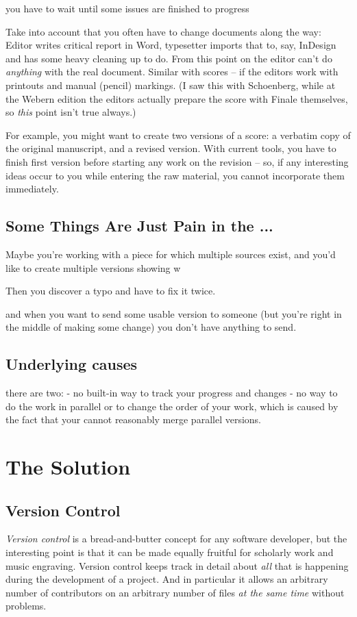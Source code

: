 \documentclass[11pt,a4paper]{article}
\begin{document}
you have to wait until some issues are finished to progress

Take into account that you often have to change documents along the way:
Editor writes critical report in Word, typesetter imports that to, say, InDesign
and has some heavy cleaning up to do. From this point on the editor can't do
\emph{anything} with the real document. Similar with scores -- if the editors work
with printouts and manual (pencil) markings. (I saw this with Schoenberg, while at
the Webern edition the editors actually prepare the score with Finale themselves,
so \emph{this} point isn't true always.)

For example, you might want to create two versions of a score:
a verbatim copy of the original manuscript, and a revised version.
With current tools, you have to finish first version before starting
any work on the revision -- so, if any interesting ideas occur to you
while entering the raw material, you cannot incorporate them immediately.

\subsection{Some Things Are Just Pain in the ...}
Maybe you're working with a piece for which multiple sources exist,
and you'd like to create multiple versions showing w

Then you discover a typo and have to fix it twice.


and when you want to send some usable version to someone
(but you're right in the middle of making some change)
you don't have anything to send.

\subsection{Underlying causes}
there are two:
- no built-in way to track your progress and changes
- no way to do the work in parallel or to change the order of your work, 
which is caused by the fact that your cannot reasonably merge parallel versions.


\section{The Solution}

\subsection{Version Control}
\emph{Version control} is a bread-and-butter concept for any software developer, but the
interesting point is that it can be made equally fruitful for scholarly work and music
engraving. Version control keeps track in detail about \emph{all} that is happening during
the development of a project. And in particular it allows an arbitrary number of contributors
on an arbitrary number of files \emph{at the same time} without problems.
\end{document}
